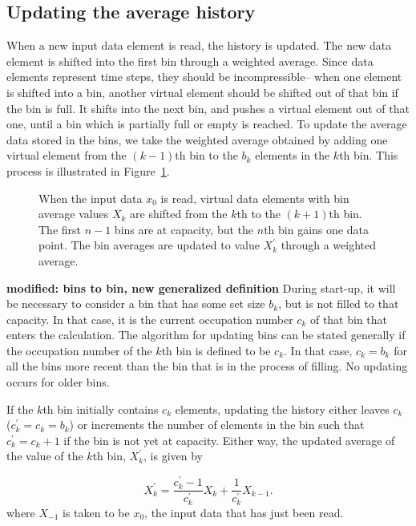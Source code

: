 \subsection{Updating the average history}
\label{sec:shifting}

When a new input data element is read, the history is updated. The new data element is shifted into the first bin through a weighted average. Since data elements represent time steps, they should be incompressible-- when one element is shifted into a bin, another virtual element should be shifted out of that bin if the bin is full. It shifts into the next bin, and pushes a virtual element out of that one, until a bin which is partially full or empty is reached. To update the average data stored in the bins, we take the weighted average obtained by adding one virtual element from the $(k-1)$th bin to the $b_k$ elements in the $k$th bin. This process is illustrated in Figure~\ref{fig:binShifting}.

\begin{figure}
\label{fig:binShifting}
\caption{When the input data $x_0$ is read, virtual data elements with bin average values $X_k$ are shifted from the $k$th to the $(k+1)$th bin. The first $n-1$ bins are at capacity, but the $n$th bin gains one data point. The bin averages are updated to value $X_k^\prime$ through a weighted average.}
\end{figure}

{\bf modified: bins to bin, new generalized definition}
During start-up, it will be necessary to consider a bin that has some
set size $b_k$, but is not filled to that capacity. In that case, it
is the current occupation number $c_k$ of that bin that enters the
calculation. The algorithm for updating bins can be stated generally if the occupation number of the $k$th bin is defined to be $c_k$. In that case, $c_k=b_k$ for all the bins more recent than the bin that is in the process of filling. No updating occurs for older bins. 

If the $k$th bin initially contains $c_k$ elements,
updating the history either leaves $c_k$ ($c_k^\prime=c_k=b_k$) or
increments the number of elements in the bin such that $c_k^\prime =
c_k + 1$ if the bin is not yet at capacity. Either way, the updated
average of the value of the $k$th bin, $X_k^\prime$, is given by

\begin{equation}
X_k^\prime = \frac{c_k^\prime-1}{c_k^\prime}X_k + \frac{1}{c_k^\prime}X_{k-1}.
\label{eqn:updating}
\end{equation}
where $X_{-1}$ is taken to be $x_0$, the input data that has just been
read. 

